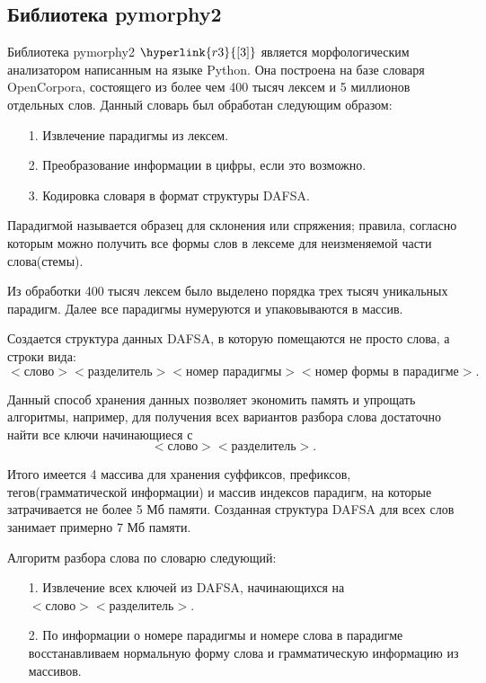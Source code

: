 \documentclass[12pt, a4paper]{article}
\begin{document}
\subsection{Библиотека pymorphy2}
\quad Библиотека pymorphy2 $\hyperlink{r3}{[3]}$ является морфологическим анализатором написанным на языке Python. Она построена на базе словаря OpenCorpora, состоящего из более чем 400 тысяч лексем и 5 миллионов отдельных слов. Данный словарь был обработан следующим образом:

\begin{enumerate}
\item[1.] Извлечение парадигмы из лексем.
\item[2.] Преобразование информации в цифры, если это возможно.
\item[3.] Кодировка словаря в формат структуры DAFSA.
\end{enumerate}

Парадигмой называется образец для склонения или спряжения; правила, согласно которым можно получить все формы слов в лексеме для неизменяемой части слова(стемы).

Из обработки 400 тысяч лексем было выделено порядка трех тысяч уникальных парадигм. Далее все парадигмы нумеруются и упаковываются в массив. 

Создается структура данных DAFSA, в которую помещаются не просто слова, а строки вида:
$$<\text{слово}> <\text{разделитель}> <\text{номер парадигмы}> <\text{номер формы в парадигме}>.$$

Данный способ хранения данных позволяет экономить память и упрощать алгоритмы, например, для получения всех вариантов разбора слова достаточно найти все ключи начинающиеся с
$$<\text{слово}> <\text{разделитель}>.$$

Итого имеется 4 массива для хранения суффиксов, префиксов, тегов(грамматической информации) и массив индексов парадигм, на которые затрачивается не более 5 Мб памяти. Созданная структура DAFSA для всех слов занимает примерно 7 Мб памяти.

Алгоритм разбора слова по словарю следующий:

\begin{enumerate}
\item[1.] Извлечение всех ключей из DAFSA, начинающихся на $<\text{слово}> <\text{разделитель}>$.
\item[2.] По информации о номере парадигмы и номере слова в парадигме восстанавливаем нормальную форму слова и грамматическую информацию из массивов.
\end{enumerate}
\end{document}
